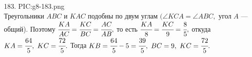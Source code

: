 183. {{PIC:g8-183.png}}\\
Треугольники $ABC$ и $KAC$ подобны по двум углам $(\angle KCA = \angle ABC,$ угол $A$ --- общий). Поэтому $\cfrac{KA}{AC}=\cfrac{KC}{BC}=\cfrac{AC}{AB},$ то есть
$\cfrac{KA}{8}=\cfrac{KC}{9}=\cfrac{8}{5},$ откуда $KA=\cfrac{64}{5},\ KC=\cfrac{72}{5}.$ Тогда $KB=\cfrac{64}{5}-5=\cfrac{39}{5},\ BC=9,\ KC=\cfrac{72}{5}.$\\
